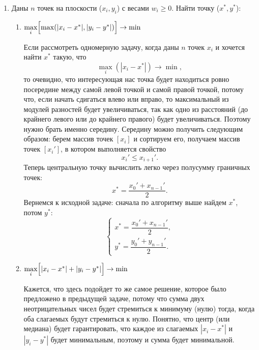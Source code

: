 \begin{enumerate}
  \item
    Даны $n$ точек на плоскости ($x_i, y_i$) с весами $w_i \ge 0$. Найти точку ($x^{*}, y^{*}$):
    \begin{enumerate}
      \item {} $\max\limits_i \Bigl[ \max(|x_i-x^{*}|, |y_i-y^{*}|) \Bigr] \rightarrow \min$
      \begin{solution}
        Если рассмотреть одномерную задачу, когда даны $n$ точек $x_i$ и хочется найти $x^{*}$ такую, что
        \begin{equation}
          \max\limits_i(|x_i-x^{*}|) \rightarrow \min,
        \end{equation}
        то очевидно, что интересующая нас точка будет находиться ровно посередине между самой левой точкой и самой правой точкой, потому что, если начать сдигаться влево или вправо, то максимальный из модулей разностей будет увеличиваться, так как одно из расстояний (до крайнего левого или до крайнего правого) будет увеличиваться. Поэтому нужно брать именно середину. Середину можно получить следующим образом: берем массив точек $[x_i]$ и сортируем его, получаем массив точек $[x_i']$, в котором выполняется свойство
        \begin{equation}
          x_{i}' \leq x_{i+1}'.
        \end{equation}
        Теперь центральную точку вычислить легко через полусумму граничных точек:
        \begin{equation}
          x^{*} = \frac{x_{0}' + x_{n-1}'}{2}.
        \end{equation}
        Вернемся к исходной задаче: сначала по алгоритму выше найдем $x^{*}$, потом $y^{*}$:
        \begin{equation}
          \begin{cases}
            x^{*} = \dfrac{x_{0}' + x_{n-1}'}{2}, \\
            y^{*} = \dfrac{y_{0}' + y_{n-1}'}{2}.
          \end{cases}
        \end{equation}
      \end{solution}
      \item {} $\max\limits_i \Bigl[ |x_i-x^{*}|+|y_i-y^{*}|  \Bigr] \rightarrow \min$
      \begin{solution}
        Кажется, что здесь подойдет то же самое решение, которое было предложено в предыдущей задаче, потому что сумма двух неотрицательных чисел будет стремиться к минимуму (нулю) тогда, когда оба слагаемых будут стремиться к нулю. Понятно, что центр (или медиана) будет гарантировать, что каждое из слагаемых $|x_i-x^{*}|$ и $|y_i-y^{*}|$ будет минимальным, поэтому и сумма будет минимальной.

\end{solution}
\end{enumerate}
\end{enumerate}
